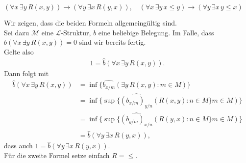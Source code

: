 
\begin{exercise}[78]

$(\forall x\, \exists y\, R(x,y)) \rightarrow (\forall y\, \exists x\, R(y,x)), \quad
(\forall x\, \exists y\, x \leq y) \rightarrow (\forall y\, \exists x\, y \leq x)$

\end{exercise}


\begin{solution}
Wir zeigen, dass die beiden Formeln allgemeingültig sind. \\
Sei dazu $\mathscr{M}$ eine $\mathscr{L}$-Struktur, $b$ eine beliebige Belegung.
Im Falle, dass $\hat{b}(\forall x\, \exists y\, R(x,y)) = 0$ sind wir bereits fertig. \\
Gelte also
\begin{align*}
  1 = \hat{b}(\forall x\, \exists y\, R(x,y)).
\end{align*}
Dann folgt mit
\begin{align*}
  \hat{b}(\forall x\, \exists y\, R(x,y))
  &= \inf\{\widehat{b_{x/m}}(\exists y\, R(x,y): m \in M)\} \\
  &= \inf\{\sup\{\widehat{(b_{x/m})_{y/n}}(R(x,y): n \in M\} m \in M)\} \\
  &= \inf\{\sup\{\widehat{(b_{y/m})_{x/n}}(R(y,x): n \in M\} m \in M)\} \\
  &= \hat{b}(\forall y\, \exists x\, R(y,x)),
\end{align*}
dass auch $1 = \hat{b}(\forall y\, \exists x\, R(y,x))$. \\
Für die zweite Formel setze einfach $R = \leq$.

\end{solution}

